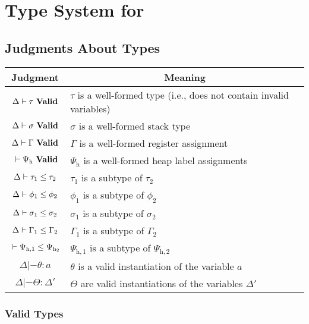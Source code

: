 \chapter{Type System for \ATAL}
\label{chap:types}


\section{Judgments About Types}

\begin{tabular}{|c|p{7.5 cm}|}
  \hline
  Judgment & \multicolumn{1}{|c|}{Meaning} \\
  \hline

  $\valid{\Delta}{\tau}$ & $\tau$ is a well-formed type (i.e., does not contain invalid variables) \\
  ${\Delta} |- {\sigma}\ \mathbf{Valid}$ & $\sigma$ is a well-formed stack type \\
  ${\Delta} |- {\Gamma}\ \mathbf{Valid}$ & $\Gamma$ is a well-formed register assignment \\
  ${} |- {\Psi_{\mathrm{h}}}\ \mathbf{Valid}$ & $\Psi_{\mathrm{h}}$ is a well-formed heap label assignments \\
  \hline

  ${\Delta} |- {\tau_1} \le {\tau_2}$ & $\tau_1$ is a subtype of $\tau_2$ \\
  ${\Delta} |- {\phi_1} \le {\phi_2}$ & $\phi_1$ is a subtype of $\phi_2$ \\
  ${\Delta} |- {\sigma_1} \le {\sigma_2}$ & $\sigma_1$ is a subtype of $\sigma_2$ \\
  ${\Delta} |- {\Gamma_1} \le {\Gamma_2}$ & $\Gamma_1$ is a subtype of $\Gamma_2$ \\
  ${} |- {\Psi_{\mathrm{h},1}} \le {\Psi_{\mathrm{h}_2}}$ & $\Psi_{\mathrm{h},1}$ is a subtype of $\Psi_{\mathrm{h},2}$ \\
  \hline

  $\Delta |- \theta : a$ & $\theta$ is a valid instantiation of the variable $a$ \\
  $\Delta |- \Theta : \Delta'$ & $\Theta$ are valid instantiations of the variables $\Delta'$ \\
  \hline
\end{tabular}


\subsection{Valid Types}
\fbox{$\valid{\Delta}{\tau}$}

